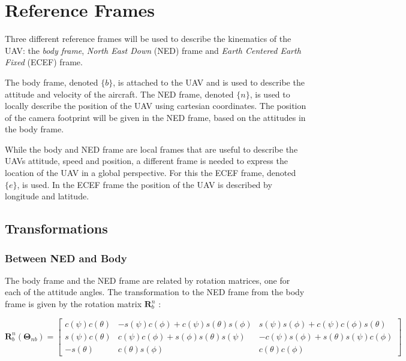 \section{Reference Frames}

Three different reference frames will be used to describe the kinematics of the UAV: the \textit{body frame}, \textit{North East Down} (NED) frame and \textit{Earth Centered Earth Fixed} (ECEF) frame. 

The body frame, denoted $\{b\}$, is attached to the UAV and is used to describe the attitude and velocity of the aircraft. The NED frame, denoted $\{n\}$, is used to locally describe the position of the UAV using cartesian coordinates. The position of the camera footprint will be given in the NED frame, based on the attitudes in the body frame.

While the body and NED frame are local frames that are useful to describe the UAVs attitude, speed and position, a different frame is needed to express the location of the UAV in a global perspective. For this the ECEF frame, denoted $\{e\}$, is used. In the ECEF frame the position of the UAV is described by longitude and latitude.


\subsection{Transformations}


\subsubsection{Between NED and Body}

The body frame and the NED frame are related by rotation matrices, one for each of the attitude angles. The transformation to the NED frame from the body frame is given by the rotation matrix $\mathbf{R}_b^n$ \cite{FOSSEN}:

\begin{equation}
	\mathbf{R}_b^n(\bm{\Theta}_{nb}) =
	\begin{bmatrix}
		c(\psi)c(\theta) & -s(\psi)c(\phi)+c(\psi)s(\theta)s(\phi) & s(\psi)s(\phi)+c(\psi)c(\phi)s(\theta) \\
		s(\psi)c(\theta) & c(\psi)c(\phi)+s(\phi)s(\theta)s(\psi) & -c(\psi)s(\phi)+s(\theta)s(\psi)c(\phi) \\
		-s(\theta) & c(\theta)s(\phi) & c(\theta)c(\phi)
	\end{bmatrix}
\end{equation}

